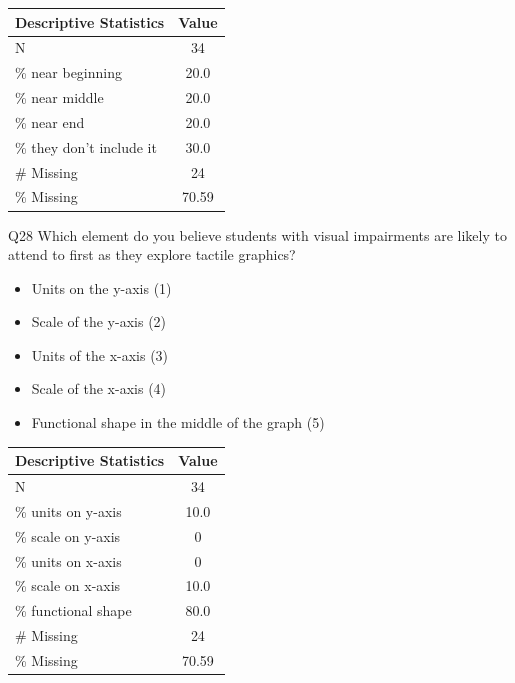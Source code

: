 \documentclass[11.5pt]{sig-alternate} %
\begin{document}
\begin{large}
\begin{table}[!h]
\centering
\begin{tabular}{lc}
Descriptive Statistics & Value\\ \hline
N	& 34\\
\% near beginning	& 20.0\\
\% near middle	& 20.0\\
\% near end	& 20.0\\
\% they don’t include it &	30.0\\
\# Missing	& 24\\
\% Missing	& 70.59\\
\end{tabular}
\end{table}
\newpage

Q28 Which element do you believe students with visual impairments are likely to attend to first as they explore tactile graphics? 
\begin{itemize}
    \item Units on the y-axis (1)
    \item Scale of the y-axis (2)
    \item Units of the x-axis (3)
    \item Scale of the x-axis (4)
    \item Functional shape in the middle of the graph (5)
\end{itemize}
\begin{table}[!h]
\centering
\begin{tabular}{lc}
Descriptive Statistics & Value\\ \hline
N	& 34\\
\% units on y-axis	& 10.0\\
\% scale on y-axis	& 0\\
\% units on x-axis	& 0\\
\% scale on x-axis &	10.0\\
\% functional shape &	80.0\\
\# Missing	& 24\\
\% Missing	& 70.59\\
\end{tabular}
\end{table}



\end{large}
\end{document}
